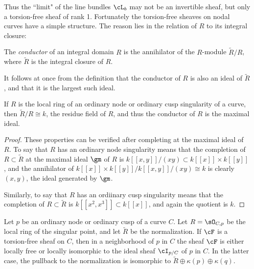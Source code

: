 Thus the ``limit" of the line bundles $\cL_b$ may not be an invertible sheaf, but only a torsion-free sheaf of rank 1. Fortunately the torsion-free sheaves on nodal curves have a simple structure. The reason lies in the relation of $R$ to its integral closure:

\begin{definition}
The \emph{conductor} of an integral domain $R$ is the annihilator of the $R$-module
$\widetilde R/R$, where $\widetilde R$ is the integral closure of $R$.
\end{definition}

It follows at once from the definition that the conductor of $R$ is also an ideal of $\widetilde R$, and that it is the largest such ideal.

\begin{proposition}
If $R$ is the local ring of an ordinary node or ordinary cusp singularity of a curve, then  $\widetilde R/R \cong k$, the residue field of $R$, and thus the conductor of $R$ is the
maximal ideal. 
\end{proposition}

\begin{proof} These properties can be verified after completing at the maximal ideal of $R$.
To say that $R$ has an ordinary node singularity means that the completion of $R \subset \widetilde R$ at the maximal ideal $\gm$ of $R$ is $k[[x,y]]/(xy)\subset k[[x]]\times k[[y]]$, and 
the annihilator of $k[[x]]\times k[[y]]/k[[x,y]]/(xy) \cong k$ is clearly $(x,y)$, the ideal generated by $\gm$.

Similarly, to say that $R$ has an ordiinary cusp singularity means that the completion of 
$R \subset \widetilde R$ is $k[[x^2,x^3]]\subset k[[x]]$, and again the quotient is $k$.
\end{proof}

\begin{lemma}\label{torsion free at node}
Let $p$ be an ordinary node or ordinary cusp of a curve $C$. Let $R = \sO_{C,p}$ be the local ring of the singular point,
and let $\tilde R$ be the normalization.  If $\cF$ is a torsion-free sheaf on $C$, then in a neighborhood of $p$ in $C$ the sheaf $\cF$ is either locally free or locally isomorphic to the ideal sheaf $\cI_{p/C}$ of $p$ in $C$.
In the latter case, the pullback to the normalization is isomorphic to $\tilde R\oplus \kappa(p) \oplus \kappa(q)$.
\end{lemma}

